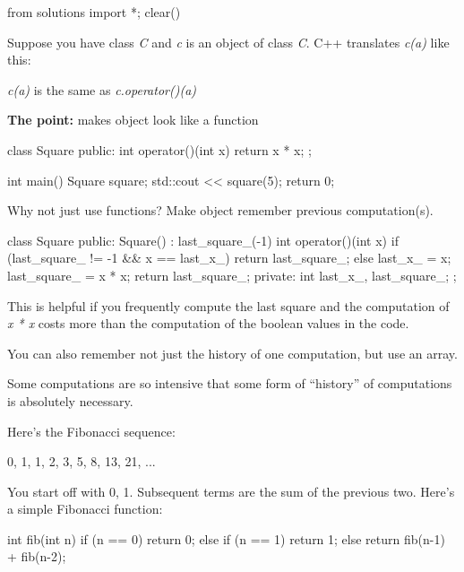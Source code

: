 \begin{python0}
from solutions import *; clear()
\end{python0}

Suppose you have class \textit{C} and \textit{c} is an object of class
\textit{C}. C++ translates \textit{c(a)} like this:

\textit{c(a)} is the same as \textit{c.operator()(a)}

\textbf{The point:} makes object look like a function

\begin{consolethree}[escapeinside=||]
class Square
{
public:
    int operator()(int x)
    {
        return x * x;
    }
};

int main()
{
    Square square;
    std::cout << square(5);
    return 0;
}
\end{consolethree}

Why not just use functions? Make object remember previous
computation(s).

\begin{consolethree}[escapeinside=||]
class Square
{
public:
    Square()
        : last_square_(-1)
    {}
    int operator()(int x)
    {
        if (last_square_ != -1 && x == last_x_)
        {
            return last_square_;
        }
        else
        {
            last_x_ = x;
            last_square_ = x * x;
            return last_square_;
        }
    }
private:
    int last_x_, last_square_;
};
\end{consolethree}

This is helpful if you frequently compute the last square and the
computation of \textit{x * x} costs more than the computation of the
boolean values in the code.

You can also remember not just the history of one computation, but use
an array.

Some computations are so intensive that some form of ``history'' of
computations is absolutely necessary.

Here's the Fibonacci sequence:

0, 1, 1, 2, 3, 5, 8, 13, 21, ...

You start off with 0, 1. Subsequent terms are the sum of the previous
two. Here's a simple Fibonacci function:

\begin{consolethree}[escapeinside=||]
int fib(int n)
{
    if (n == 0)
        return 0;
    else if (n == 1)
        return 1;
    else
        return fib(n-1) + fib(n-2);
}
\end{consolethree}

